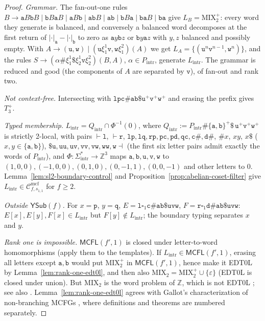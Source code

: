 \documentclass[11pt]{article}
\numberwithin{equation}{section}
\theoremstyle{plain}
\theoremstyle{definition}
\theoremstyle{remark}
\newcommand{\Cmcf}[2]{\mathcal{C}^{\mathrm{mcf}}_{#1,#2}}
\newcommand{\blank}{\square}
\newcommand{\eps}{\varepsilon}
\newcommand{\YSub}[1]{\mathsf{YSub}(#1)}
\theoremstyle{plain}
\begin{document}
\begin{proof}
\emph{Grammar.}  The fan-out-one rules
$B\to\mathtt aB\mathtt bB\mid\mathtt bB\mathtt aB\mid\mathtt aB\mathtt b\mid
\mathtt{ab}B\mid\mathtt{ab}\mid\mathtt bB\mathtt a\mid\mathtt{ba}B\mid\mathtt{ba}$
give $L_B=\mathrm{MIX}_2^+$: every word they generate is balanced, and conversely a
balanced word decomposes at the first return of $|\cdot|_{\mathtt a}-|\cdot|_{\mathtt b}$
to zero as $\mathtt ay\mathtt bz$ or $\mathtt by\mathtt az$ with $y,z$ balanced and
possibly empty.  With $A\to(\mathtt u,\mathtt w)\mid(\mathtt u\xi_1^1\mathtt v,
\mathtt w\xi_1^2)(A)$ we get $L_A=\{(\mathtt u^n\mathtt v^{n-1},\mathtt w^n)\}$, and
the rules $S\to(\alpha\mathtt\#\xi_1^1\mathtt\$\xi_2^1\mathtt v\xi_2^2)(B,A)$,
$\alpha\in P_{\mathrm{intr}}$, generate $L_{\mathrm{intr}}$.  The grammar is reduced and
good (the components of $A$ are separated by $\mathtt v$), of fan-out and rank two.

\emph{Not context-free.}  Intersecting with $\mathtt{lpc\#ab\$}\mathtt u^+\mathtt v^+
\mathtt w^+$ and erasing the prefix gives $T_3^+$.

\emph{Typed membership.}  $L_{\mathrm{intr}}=Q_{\mathrm{intr}}\cap\Phi^{-1}(0)$, where
$Q_{\mathrm{intr}}:=P_{\mathrm{intr}}\mathtt\#\{\mathtt a,\mathtt b\}^+\mathtt\$\,
\mathtt u^+\mathtt v^+\mathtt w^+$ is strictly 2-local, with pairs
$\vdash\mathtt l$, $\vdash\mathtt r$, $\mathtt{lp},\mathtt{lq},\mathtt{rp},\mathtt{pc},
\mathtt{pd},\mathtt{qc},\mathtt{c\#},\mathtt{d\#}$, $\mathtt{\#}x$, $xy$, $x\mathtt\$$
($x,y\in\{\mathtt a,\mathtt b\}$), $\mathtt{\$u},\mathtt{uu},\mathtt{uv},\mathtt{vv},
\mathtt{vw},\mathtt{ww},\mathtt w\dashv$ (the first six letter pairs admit exactly the
words of $P_{\mathrm{intr}}$), and $\Phi:\Sigma_{\mathrm{intr}}^*\to\mathbb Z^3$ maps
$\mathtt a,\mathtt b,\mathtt u,\mathtt v,\mathtt w$ to $(1,0,0),(-1,0,0),(0,1,0),
(0,-1,1),(0,0,-1)$ and other letters to $0$.  Lemma~\ref{lem:sl2-boundary-control} and
Proposition~\ref{prop:abelian-coset-filter} give
$L_{\mathrm{intr}}\in\Cmcf{f}{s_{1,1}}$ for $f\ge2$.

\emph{Outside $\YSub{f}$.}  For $x=\mathtt p$, $y=\mathtt q$,
$E=\mathtt l\blank_1\mathtt{c\#ab\$uvw}$, $F=\mathtt r\blank_1\mathtt{d\#ab\$uvw}$:
$E[x],E[y],F[x]\in L_{\mathrm{intr}}$ but $F[y]\notin L_{\mathrm{intr}}$; the boundary
typing separates $x$ and $y$.

\emph{Rank one is impossible.}  $\mathsf{MCFL}(f',1)$ is closed under letter-to-word
homomorphisms (apply them to the templates).  If $L_{\mathrm{intr}}\in\mathsf{MCFL}(f',1)$,
erasing all letters except $\mathtt a,\mathtt b$ would put $\mathrm{MIX}_2^+$ in
$\mathsf{MCFL}(f',1)$, hence make it EDT0L by Lemma~\ref{lem:rank-one-edt0l}, and then
also $\mathrm{MIX}_2=\mathrm{MIX}_2^+\cup\{\eps\}$ (EDT0L is closed under union).  But
$\mathrm{MIX}_2$ is the word problem of $\mathbb Z$, which is not EDT0L
\cite{BishopEtAl2026EDT0L}; see also \cite[Corollary~32]{Gallot2021}.
Lemma~\ref{lem:rank-one-edt0l} agrees with Gallot's characterization of
non-branching MCFGs \cite[Definition~38 and Theorems~28--29]{Gallot2021}, where
definitions and theorems are numbered separately.
\end{proof}
\end{document}
